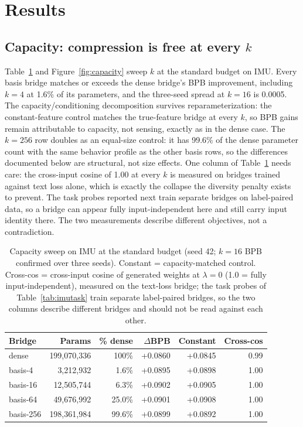 \documentclass[11pt]{article}
\begin{document}
\section{Results}

\subsection{Capacity: compression is free at every $k$}
Table~\ref{tab:capacity} and Figure~\ref{fig:capacity} sweep $k$ at the standard budget on IMU. Every basis bridge matches or exceeds the dense bridge's BPB improvement, including $k{=}4$ at 1.6\% of its parameters, and the three-seed spread at $k{=}16$ is 0.0005. The capacity/conditioning decomposition survives reparameterization: the constant-feature control matches the true-feature bridge at every $k$, so BPB gains remain attributable to capacity, not sensing, exactly as in the dense case. The $k{=}256$ row doubles as an equal-size control: it has 99.6\% of the dense parameter count with the same behavior profile as the other basis rows, so the differences documented below are structural, not size effects. One column of Table~\ref{tab:capacity} needs care: the cross-input cosine of 1.00 at every $k$ is measured on bridges trained against text loss alone, which is exactly the collapse the diversity penalty exists to prevent. The task probes reported next train separate bridges on label-paired data, so a bridge can appear fully input-independent here and still carry input identity there. The two measurements describe different objectives, not a contradiction.

\begin{table}[t]
\centering
\caption{Capacity sweep on IMU at the standard budget (seed 42; $k{=}16$ BPB confirmed over three seeds). Constant = capacity-matched control. Cross-cos = cross-input cosine of generated weights at $\lambda = 0$ (1.0 = fully input-independent), measured on the text-loss bridge; the task probes of Table~\ref{tab:imutask} train separate label-paired bridges, so the two columns describe different bridges and should not be read against each other.}
\label{tab:capacity}
\begin{tabular}{lrrrrr}
\toprule
Bridge & Params & \% dense & $\Delta$BPB & Constant & Cross-cos \\
\midrule
dense & 199,070,336 & 100\% & +0.0860 & +0.0845 & 0.99 \\
basis-4 & 3,212,932 & 1.6\% & +0.0895 & +0.0898 & 1.00 \\
basis-16 & 12,505,744 & 6.3\% & +0.0902 & +0.0905 & 1.00 \\
basis-64 & 49,676,992 & 25.0\% & +0.0901 & +0.0908 & 1.00 \\
basis-256 & 198,361,984 & 99.6\% & +0.0899 & +0.0892 & 1.00 \\
\bottomrule
\end{tabular}
\end{table}
\end{document}
